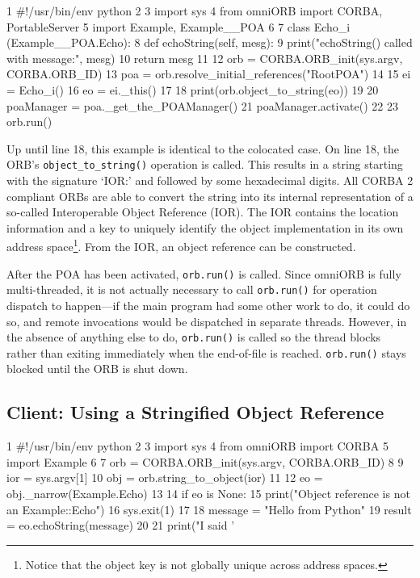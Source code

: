 \documentclass[11pt,oneside,a4paper]{book}
\newcommand{\op}[1]{\texttt{#1()}}
\begin{document}
\lstset{numbers=left,gobble=4}
\begin{pylisting}
 1  #!/usr/bin/env python
 2  
 3  import sys
 4  from omniORB import CORBA, PortableServer
 5  import Example, Example__POA
 6  
 7  class Echo_i (Example__POA.Echo):
 8      def echoString(self, mesg):
 9          print("echoString() called with message:", mesg)
10          return mesg
11  
12  orb = CORBA.ORB_init(sys.argv, CORBA.ORB_ID)
13  poa = orb.resolve_initial_references("RootPOA")
14  
15  ei = Echo_i()
16  eo = ei._this()
17  
18  print(orb.object_to_string(eo))
19  
20  poaManager = poa._get_the_POAManager()
21  poaManager.activate()
22  
23  orb.run()
\end{pylisting}
\lstset{numbers=none,gobble=0}

\noindent Up until line 18, this example is identical to the colocated
case. On line 18, the ORB's \op{object\_to\_string} operation is
called. This results in a string starting with the signature `IOR:'
and followed by some hexadecimal digits. All CORBA 2 compliant ORBs
are able to convert the string into its internal representation of a
so-called Interoperable Object Reference (IOR). The IOR contains the
location information and a key to uniquely identify the object
implementation in its own address space\footnote{Notice that the
  object key is not globally unique across address spaces.}. From the
IOR, an object reference can be constructed.

After the POA has been activated, \op{orb.run} is called. Since
omniORB is fully multi-threaded, it is not actually necessary to call
\op{orb.run} for operation dispatch to happen---if the main program
had some other work to do, it could do so, and remote invocations
would be dispatched in separate threads. However, in the absence of
anything else to do, \op{orb.run} is called so the thread blocks
rather than exiting immediately when the end-of-file is reached.
\op{orb.run} stays blocked until the ORB is shut down.

\vspace{\baselineskip}%

\subsection{Client: Using a Stringified Object Reference}
\label{clnt2}

\lstset{numbers=left,gobble=4}
\begin{pylisting}
 1  #!/usr/bin/env python
 2  
 3  import sys
 4  from omniORB import CORBA
 5  import Example
 6  
 7  orb = CORBA.ORB_init(sys.argv, CORBA.ORB_ID)
 8  
 9  ior = sys.argv[1]
10  obj = orb.string_to_object(ior)
11  
12  eo = obj._narrow(Example.Echo)
13  
14  if eo is None:
15      print("Object reference is not an Example::Echo")
16      sys.exit(1)
17  
18  message = "Hello from Python"
19  result  = eo.echoString(message)
20  
21  print("I said '%
\end{pylisting}
\lstset{numbers=none,gobble=0}
\end{document}
